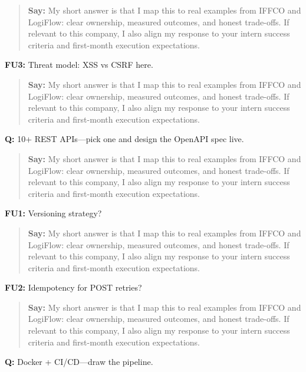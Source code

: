 \documentclass[9pt,a4paper]{article}
\begin{document}
\begin{quote}\small\textbf{Say:} My short answer is that I map this to real examples from IFFCO and LogiFlow: clear ownership, measured outcomes, and honest trade-offs. If relevant to this company, I also align my response to your intern success criteria and first-month execution expectations.\end{quote}
\vspace{2mm}
\textbf{FU3:} Threat model: XSS vs CSRF here.

\begin{quote}\small\textbf{Say:} My short answer is that I map this to real examples from IFFCO and LogiFlow: clear ownership, measured outcomes, and honest trade-offs. If relevant to this company, I also align my response to your intern success criteria and first-month execution expectations.\end{quote}
\vspace{2mm}
\textbf{Q:} 10+ REST APIs---pick one and design the OpenAPI spec live.

\begin{quote}\small\textbf{Say:} My short answer is that I map this to real examples from IFFCO and LogiFlow: clear ownership, measured outcomes, and honest trade-offs. If relevant to this company, I also align my response to your intern success criteria and first-month execution expectations.\end{quote}
\vspace{2mm}
\textbf{FU1:} Versioning strategy?

\begin{quote}\small\textbf{Say:} My short answer is that I map this to real examples from IFFCO and LogiFlow: clear ownership, measured outcomes, and honest trade-offs. If relevant to this company, I also align my response to your intern success criteria and first-month execution expectations.\end{quote}
\vspace{2mm}
\textbf{FU2:} Idempotency for POST retries?

\begin{quote}\small\textbf{Say:} My short answer is that I map this to real examples from IFFCO and LogiFlow: clear ownership, measured outcomes, and honest trade-offs. If relevant to this company, I also align my response to your intern success criteria and first-month execution expectations.\end{quote}
\vspace{2mm}
\textbf{Q:} Docker + CI/CD---draw the pipeline.
\end{document}
